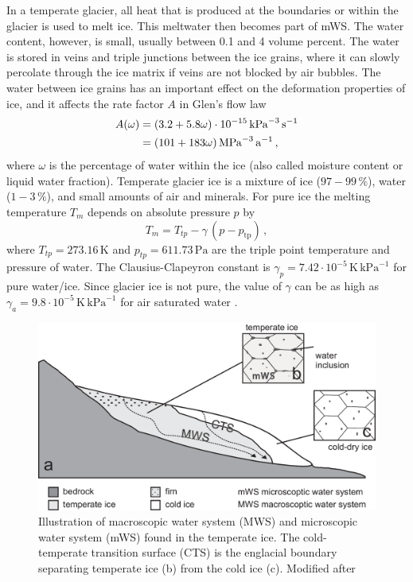 \documentclass[parskip=half]{scrartcl}
\newcommand{\unit}[1]{\ensuremath{\,\mathrm{#1}}}
\begin{document}
In a temperate glacier, all heat that is produced at the boundaries or
within the glacier is used to melt ice. This meltwater then becomes
part of mWS. The water content, however, is small, usually between 0.1
and 4 volume percent.  The water is stored in veins and triple
junctions between the ice grains, where it can slowly percolate
through the ice matrix if veins are not blocked by air bubbles.  The
water between ice grains has an important effect on the deformation
properties of ice, and it affects the rate factor $A$ in Glen's flow
law \citep{Duval1977,Paterson1994}
%
\begin{align}
 \label{eq:ratefactor-water} A(\omega) &= (3.2 + 5.8 \omega) \cdot
10^{-15} \unit{kPa}^{-3}\unit{s}^{-1} \notag\\ &= (101 + 183\omega)
\unit{MPa}^{-3}\unit{a}^{-1}\,,
\end{align}
%
where $\omega$ is the percentage of water within the ice (also called
moisture content or liquid water fraction).
%
Temperate glacier ice is a mixture of ice ($97-99\unit{\%}$), water
($1-3\unit{\%}$), and small amounts of air and minerals.  For pure ice
the melting temperature $T_m$ depends on absolute pressure $p$ by
%
\begin{equation}
 \label{eq:clausius-pure} T_m = T_{tp} - \gamma\, (p -
p_{\text{tp}})\,,
\end{equation}
% 
where $T_{tp}=273.16\unit{K}$ and $p_{tp}=611.73\unit{Pa}$ are the
triple point temperature and pressure of water.  The
Clausius-Clapeyron constant is $\gamma_{p}= 7.42 \cdot 10^{-5}
\unit{K}\unit{kPa}^{-1}$ for pure water/ice.  Since glacier ice is not
pure, the value of $\gamma$ can be as high as $\gamma_a = 9.8 \cdot
10^{-5} \unit{K}\unit{kPa}^{-1}$ for air saturated water
\citep{Harrison1975a}.


 \begin{figure}[tbhp] \centering
  \includegraphics[width=12.cm]{figures/mws}
  \caption{Illustration of macroscopic water system (MWS) and
microscopic water system (mWS) found in the temperate ice. The
cold-temperate transition surface (CTS) is the englacial boundary
separating temperate ice (b) from the cold ice (c). Modified after
\cite{Gusmeroli2010}}
  \label{fig:mws}
\end{figure}
\end{document}
